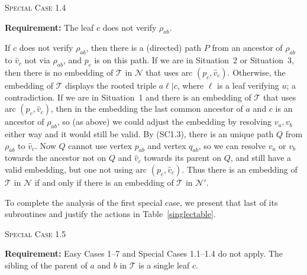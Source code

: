 \documentclass[11pt]{amsart}
\begin{document}
\begin{algorithm}[H]
 \caption{\textsc{Special Case 1.4}}
\begin{algorithmic}[1]
 \Statex\textbf{Requirement:} The leaf $c$ does not verify $\rho_{ab}$.
 \end{algorithmic}
\end{algorithm}
If $c$ does not verify $\rho_{ab}$, then there is a (directed) path $P$ from an ancestor of $\rho_{ab}$ to $\hat v_c$ not via $\rho_{ab}$, and $p_c$ is on this path. If we are in Situation~2 or Situation~3, then there is no embedding of ${{\mathcal T}}$ in ${{\mathcal N}}$ that uses arc $(p_c,\hat v_c)$. Otherwise, the embedding of ${{\mathcal T}}$ displays the rooted triple $a\ell|c$, where $\ell$ is a leaf verifying $u$; a contradiction. If we are in Situation~1 and there is an embedding of ${{\mathcal T}}$ that uses arc $(p_c,\hat v_c)$, then in the embedding the last common ancestor of $a$ and $c$ is an ancestor of $\rho_{ab}$, so (as above) we could adjust the embedding by resolving $v_a,v_b$ either way and it would still be valid. By (SC1.3), there is an unique path $Q$ from $\rho_{ab}$ to $\hat v_c$. Now $Q$ cannot use vertex $p_{ab}$ and vertex $q_{ab}$, so we can resolve $v_a$ or $v_b$ towards the ancestor not on $Q$ and $\hat v_c$ towards its parent on $Q$, and still have a valid embedding, but one not using arc $(p_c,\hat v_c)$. Thus  there is an embedding of ${{\mathcal T}}$ in ${{\mathcal N}}$ if and only if there is an embedding of ${{\mathcal T}}$ in ${{\mathcal N}}'$.

To complete the analysis of the first special case, we present that last of its subroutines and justify the actions in Table~\ref{singlectable}.

\begin{algorithm}[H]\label{SC1.5}
 \caption{\textsc{Special Case 1.5}}
\begin{algorithmic}[1]
 \Statex\textbf{Requirement:} Easy Cases 1--7 and Special Cases 1.1--1.4 do not apply. The sibling of the parent of $a$ and $b$ in ${{\mathcal T}}$ is a single leaf $c$.
 \end{algorithmic}
\end{algorithm}
\end{document}
